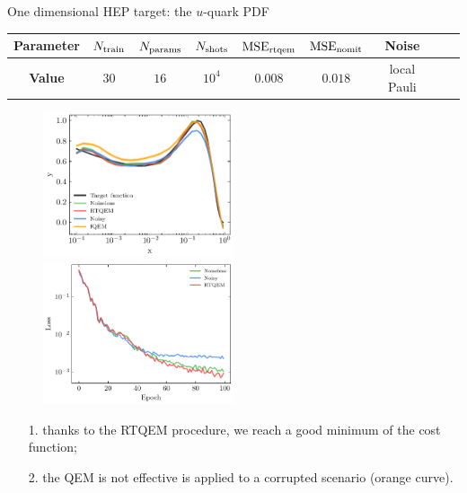 \documentclass[8pt, xcolor={svgnames}, hyperref={linkcolor=black}]{beamer}
\begin{document}
\begin{frame}{One dimensional HEP target: the $u$-quark PDF}

\begin{center}
\footnotesize
\begin{tabular}{ccccccccc}
\hline \hline 
\rule{0pt}{2.5ex}
\textbf{Parameter} & $N_{\rm train}$ & $N_{\rm params}$ & $N_{\rm shots}$ 
& $\text{MSE}_{\rm rtqem}$ &  $\text{MSE}_{\rm nomit}$ & Noise \\
\hline
\rule{0pt}{2.5ex}
\textbf{Value} & $30$ & $16$ & $10^{4}$ &  $0.008$ & $0.018$ & local Pauli \\
\hline \hline 
\end{tabular}
\end{center}

\begin{figure}
    \includegraphics[width=0.5\textwidth]{figures/qpdf.pdf}%
    \includegraphics[width=0.5\textwidth]{figures/qpdf_loss.pdf}
\end{figure}
\begin{itemize}[noitemsep]
\item[1.] thanks to the RTQEM procedure, we reach a good minimum of the cost function;
\item[2.] the QEM is not effective is applied to a corrupted scenario (orange curve).
\end{itemize}
\end{frame}
\end{document}
